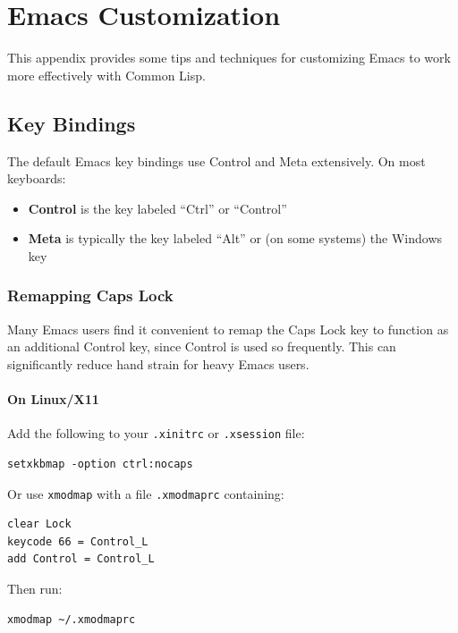 \chapter{Emacs Customization}

This appendix provides some tips and techniques for customizing Emacs to work more effectively with Common Lisp.

\section{Key Bindings}

The default Emacs key bindings use Control and Meta extensively. On most keyboards:

\begin{itemize}
\item \textbf{Control} is the key labeled ``Ctrl'' or ``Control''
\item \textbf{Meta} is typically the key labeled ``Alt'' or (on some systems) the Windows key
\end{itemize}

\subsection{Remapping Caps Lock}

Many Emacs users find it convenient to remap the Caps Lock key to function as an additional
Control key, since Control is used so frequently. This can significantly reduce hand strain
for heavy Emacs users.

\subsubsection{On Linux/X11}

Add the following to your \texttt{.xinitrc} or \texttt{.xsession} file:

\begin{verbatim}
setxkbmap -option ctrl:nocaps
\end{verbatim}

Or use \texttt{xmodmap} with a file \texttt{.xmodmaprc} containing:

\begin{verbatim}
clear Lock
keycode 66 = Control_L
add Control = Control_L
\end{verbatim}

Then run:

\begin{verbatim}
xmodmap ~/.xmodmaprc
\end{verbatim}

